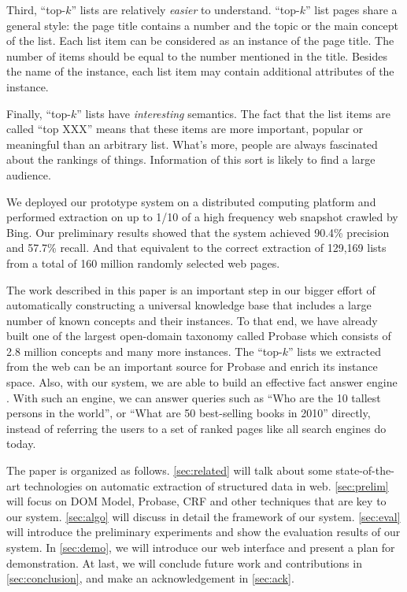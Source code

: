 Third, ``top-$k$'' lists are relatively {\em easier} to understand.
``top-$k$'' list pages share a general style: the page title contains a number and
the topic or the main concept of the list.
Each list item can be considered as an instance of the page title.
The number of items should be equal to the number mentioned in the title.
Besides the name of the instance, each list item
may contain additional attributes of the instance.

Finally, ``top-$k$'' lists have {\em interesting} semantics.
The fact that the list items
are called ``top XXX'' means that these items are more important, popular or
meaningful than an arbitrary list. What's more, people are always fascinated
about the rankings of things. Information of this sort is likely to find a
large audience.

We deployed our prototype system on a distributed computing platform
and performed extraction on up to 1/10 of a high frequency web snapshot
crawled by Bing. Our preliminary results showed that the system achieved
90.4\% precision and 57.7\% recall. And that equivalent to the correct
extraction of 129,169 lists from a total of 160 million randomly selected web pages.

The work described in this paper is an important step in our bigger effort of
automatically constructing a universal knowledge base
that includes a large number of known concepts and their instances.
To that end, we have already built one of the largest open-domain taxonomy
called Probase \cite{WuLWZ12:Probase}
which consists of 2.8 million concepts and many more instances.
The ``top-$k$'' lists we extracted from the web can be an important source for Probase and enrich its instance space.
Also, with our system,
we are able to build an effective fact answer engine \cite{YinTL11:Facto}.
With such an engine, we can answer queries such as
``Who are the 10 tallest persons in the world'', or ``What are 50 best-selling
books in 2010'' directly, instead of referring the users to a set of ranked
pages like all search engines do today.

The paper is organized as follows.
 \ref{sec:related} will talk about
some state-of-the-art technologies on automatic extraction of structured data in web.
 \ref{sec:prelim} will focus on DOM Model, Probase, CRF and other techniques that are key to our system.
 \ref{sec:algo} will discuss in detail the framework of our system.
 \ref{sec:eval} will introduce the preliminary experiments and show the evaluation results of our system.
In  \ref{sec:demo}, we will introduce our web interface and present a plan for demonstration.
At last, we will conclude future work and contributions in  \ref{sec:conclusion},
and make an acknowledgement in  \ref{sec:ack}.
